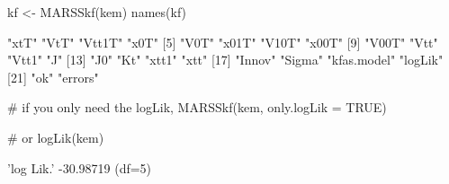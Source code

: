 \begin{Schunk}
\begin{Sinput}
 kf <- MARSSkf(kem)
 names(kf)
\end{Sinput}
\begin{Soutput}
 [1] "xtT"        "VtT"        "Vtt1T"      "x0T"       
 [5] "V0T"        "x01T"       "V10T"       "x00T"      
 [9] "V00T"       "Vtt"        "Vtt1"       "J"         
[13] "J0"         "Kt"         "xtt1"       "xtt"       
[17] "Innov"      "Sigma"      "kfas.model" "logLik"    
[21] "ok"         "errors"    
\end{Soutput}
\begin{Sinput}
 # if you only need the logLik, 
 MARSSkf(kem, only.logLik = TRUE)
\end{Sinput}
\begin{Sinput}
 # or
 logLik(kem)
\end{Sinput}
\begin{Soutput}
'log Lik.' -30.98719 (df=5)
\end{Soutput}
\end{Schunk}
